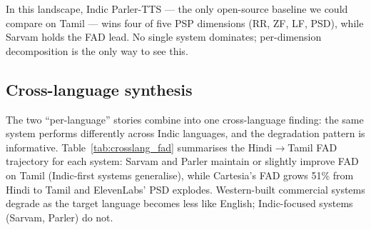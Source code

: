\documentclass[conference,a4paper]{IEEEtran}
\begin{document}
In this landscape, Indic Parler-TTS --- the only open-source baseline we could compare on Tamil --- wins four of five PSP dimensions (RR, ZF, LF, PSD), while Sarvam holds the FAD lead. No single system dominates; per-dimension decomposition is the only way to see this.

\subsection{Cross-language synthesis}

The two ``per-language'' stories combine into one cross-language finding: the same system performs differently across Indic languages, and the degradation pattern is informative. Table~\ref{tab:crosslang_fad} summarises the Hindi$\to$Tamil FAD trajectory for each system: Sarvam and Parler maintain or slightly improve FAD on Tamil (Indic-first systems generalise), while Cartesia's FAD grows 51\% from Hindi to Tamil and ElevenLabs' PSD explodes. Western-built commercial systems degrade as the target language becomes less like English; Indic-focused systems (Sarvam, Parler) do not.

\begin{table}[t]
\centering
\caption{Cross-language FAD trajectory Hindi $\to$ Tamil (negative $\Delta$ = improves).}
\label{tab:crosslang_fad}
\small
{}
\end{table}
\end{document}
